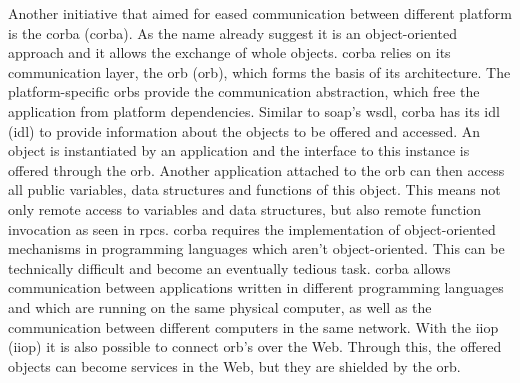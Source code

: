 Another initiative that aimed for eased communication between different platform is the \textrm{\acrlong{corba} (\acrshort{corba})}\cite{dec1991common}.
As the name already suggest it is an object-oriented approach and it allows the exchange of whole objects.
\textrm{\acrshort{corba}} relies on its communication layer, the \textrm{\acrlong{orb} (\acrshort{orb})}, which forms the basis of its architecture.
The platform-specific \textrm{\acrshort{orb}}s provide the communication abstraction, which free the application from platform dependencies.
Similar to \textrm{\acrshort{soap}}'s \textrm{\acrshort{wsdl}}, \textrm{\acrshort{corba}} has its \textrm{\acrlong{idl} (\acrshort{idl})} to provide information about the objects to be offered and accessed.
An object is instantiated by an application and the interface to this instance is offered through the \textrm{\acrshort{orb}}.
Another application attached to the \textrm{\acrshort{orb}} can then access all public variables, data structures and functions of this object.
This means not only remote access to variables and data structures, but also remote function invocation as seen in \acrshort{rpc}s.
\textrm{\acrshort{corba}} requires the implementation of object-oriented mechanisms in programming languages which aren't object-oriented.
This can be technically difficult and become an eventually tedious task.
\textrm{\acrshort{corba}} allows communication between applications written in different programming languages and which are running on the same physical computer, as well as the communication between different computers in the same network.
With the \textrm{\acrlong{iiop} (\acrshort{iiop})} it is also possible to connect \textrm{\acrshort{orb}}'s over the Web.
Through this, the offered objects can become services in the Web, but they are shielded by the \textrm{\acrshort{orb}}.


